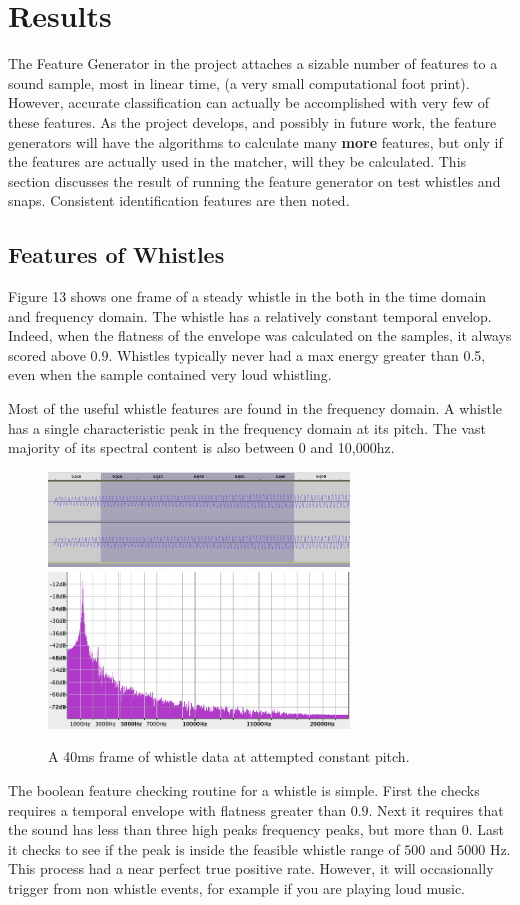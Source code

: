 \documentclass[DIV=calc, paper=a4, fontsize=11pt, twocolumn]{scrartcl}   %
\begin{document}
\section{Results}
   The Feature Generator in the project attaches a sizable number of features to a sound sample, most in linear time,  (a very small computational foot print). However, accurate classification can actually be accomplished with very few of these features. As the project develops, and possibly in future work, the feature generators will have the algorithms to calculate many \textbf{more} features, but only if the features are actually used in the matcher, will they be calculated. This section discusses the result of running the feature generator on test whistles and snaps. Consistent identification features are then noted.
   \subsection{Features of Whistles}

   Figure 13 shows one frame of a steady whistle in the both in the time domain and frequency domain. The whistle has a relatively constant temporal envelop. Indeed, when the flatness of the envelope was calculated on the samples, it always scored above $0.9$. Whistles typically never had a max energy greater than 0.5, even when the sample contained very loud whistling.
   \par Most of the useful whistle features are found in the frequency domain. A whistle has a single characteristic peak in the frequency domain at its pitch. The vast majority of its spectral content is also between 0 and 10,000hz.


   \begin{figure}[h]
   \centering
   \includegraphics[width=80mm]{figures/whistle_frame_t.png}
   \includegraphics[width=80mm]{figures/whistle_frame_f.png}
   \caption{A 40ms frame of whistle data at attempted constant pitch.}
   \label{overflow}
   \end{figure}
   \par The boolean feature checking routine for a whistle is simple. First the checks requires a temporal envelope with flatness greater than $0.9$. Next it requires that the sound has less than three high peaks frequency peaks, but more than 0. Last it checks to see if the peak is inside the feasible whistle range of $500$ and $5000$ Hz. This process had a near perfect true positive rate. However, it will occasionally trigger from non whistle events, for example if you are playing loud music.
\end{document}
